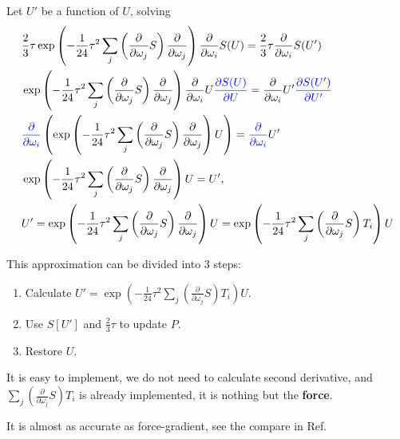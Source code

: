 Let $U'$ be a function of $U$, solving
\begin{equation}
\begin{split}
&\frac{2}{3}\tau \exp\left(-\frac{1}{24}\tau ^2 \sum _j\left(\frac{\partial}{\partial \omega _j}S\right)\frac{\partial}{\partial \omega _j}\right)\frac{\partial}{\partial \omega_i}S(U)=\frac{2}{3}\tau\frac{\partial}{\partial \omega _i}S(U')\\
&\exp\left(-\frac{1}{24}\tau ^2 \sum _j\left(\frac{\partial}{\partial \omega _j}S\right)\frac{\partial}{\partial \omega _j}\right)\frac{\partial}{\partial \omega_i}U\textcolor[rgb]{0,0,1}{\frac{\partial S(U)}{\partial U}}=\frac{\partial}{\partial \omega _i}U'\textcolor[rgb]{0,0,1}{\frac{\partial S(U')}{\partial U'}}\\
&\textcolor[rgb]{0,0,1}{\frac{\partial }{\partial \omega _i}}\left(\exp\left(-\frac{1}{24}\tau ^2 \sum _j\left(\frac{\partial}{\partial \omega _j}S\right)\frac{\partial}{\partial \omega _j}\right)U\right)=\textcolor[rgb]{0,0,1}{\frac{\partial }{\partial \omega _i}}U'\\
&\exp\left(-\frac{1}{24}\tau ^2 \sum _j\left(\frac{\partial}{\partial \omega _j}S\right)\frac{\partial}{\partial \omega _j}\right)U=U',\\
&U'=\exp\left(-\frac{1}{24}\tau ^2 \sum _j\left(\frac{\partial}{\partial \omega _j}S\right)\frac{\partial}{\partial \omega _j}\right)U=\exp\left(-\frac{1}{24}\tau ^2 \sum _j\left(\frac{\partial}{\partial \omega _j}S\right)T_i\right)U\\
\end{split}
\end{equation}

This approximation can be divided into 3 steps:

\begin{enumerate}
  \item Calculate $U'=\exp\left(-\frac{1}{24}\tau ^2 \sum _j\left(\frac{\partial}{\partial \omega _j}S\right)T_i\right)U$.
  \item Use $S[U']$ and $\frac{2}{3}\tau$ to update $P$.
  \item Restore $U$.
\end{enumerate}

It is easy to implement, we do not need to calculate second derivative, and $\sum _j\left(\frac{\partial}{\partial \omega _j}S\right)T_i$ is already implemented, it is nothing but the \textbf{force}.

It is almost as accurate as force-gradient, see the compare in Ref.~\cite{forcegradient3}

